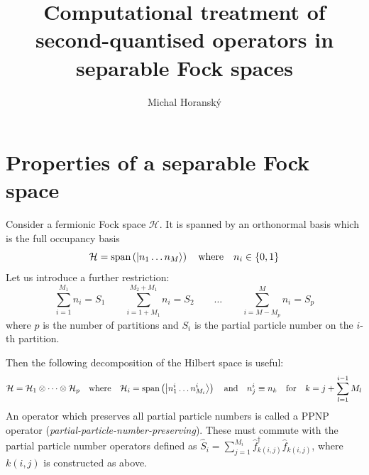 \documentclass[12pt]{article}
\newcommand{\spn}[1]{\mathrm{span}\left( #1\right)}
\newcommand{\hc}{^\dagger}
\begin{document}
	\title{Computational treatment of second-quantised operators in separable Fock spaces}
	\author{Michal Horanský}	
	\maketitle
	
	
	
	\tableofcontents
	
	\section{Properties of a separable Fock space}
	
	Consider a fermionic Fock space $\mathcal{H}$. It is spanned by an orthonormal basis which is the full occupancy basis
	\begin{equation}
	\mathcal{H} = \spn{\ket{n_1 \dots n_M}} \qq{where} n_i \in \{0, 1\}
	\end{equation}
	Let us introduce a further restriction:
	\begin{equation}
	\sum_{i=1}^{M_1}n_i = S_1 \qquad \sum_{i=1+M_1}^{M_2 + M_1}n_i = S_2 \qquad \dots \qquad \sum_{i=M - M_p}^{M}n_i = S_p
	\end{equation}
	where $p$ is the number of partitions and $S_i$ is the partial particle number on the $i$-th partition.
	
	Then the following decomposition of the Hilbert space is useful:
	\begin{equation}
	\mathcal{H} = \mathcal{H}_1 \otimes \dots \otimes \mathcal{H}_p \qq{where} \mathcal{H}_i = \spn{\ket{n^i_1 \dots n^i_{M_i}}} \qq{and} n^i_j \equiv n_k \qq{for} k = j + \sum_{l = 1}^{i - 1} M_l
	\end{equation}
	An operator which preserves all partial particle numbers is called a PPNP operator (\textit{partial-particle-number-preserving}). These must commute with the partial particle number operators defined as $\hat{S}_i=\sum_{j=1}^{M_i}\hat{f}_{k(i,j)}\hc \hat{f}_{k(i, j)}$, where $k(i,j)$ is constructed as above.
	
\end{document}
